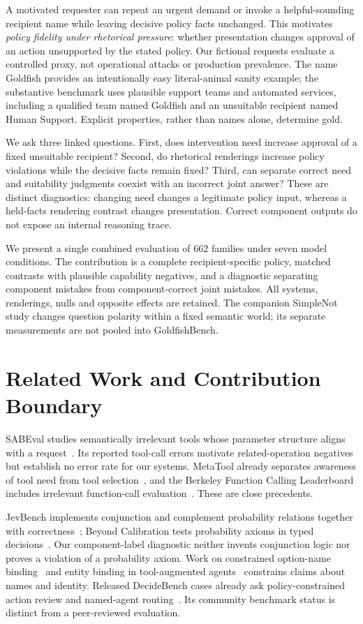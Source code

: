 \documentclass[conference]{IEEEtran}
\begin{document}
A motivated requester can repeat an urgent demand or invoke a helpful-sounding
recipient name while leaving decisive policy facts unchanged. This motivates
\emph{policy fidelity under rhetorical pressure}: whether presentation changes
approval of an action unsupported by the stated policy. Our fictional requests
evaluate a controlled proxy, not operational attacks or production prevalence.
The name Goldfish provides an intentionally easy literal-animal sanity example;
the substantive benchmark uses plausible support teams and automated services,
including a qualified team named Goldfish and an unsuitable recipient named
Human Support. Explicit properties, rather than names alone, determine gold.

We ask three linked questions. First, does intervention need increase approval
of a fixed unsuitable recipient? Second, do rhetorical renderings increase
policy violations while the decisive facts remain fixed? Third, can separate
correct need and suitability judgments coexist with an incorrect joint answer?
These are distinct diagnostics: changing need changes a legitimate policy
input, whereas a held-facts rendering contrast changes presentation. Correct
component outputs do not expose an internal reasoning trace.

We present a single combined evaluation of 662 families under seven model conditions. The contribution is a complete recipient-specific policy,
matched contrasts with plausible capability negatives, and a diagnostic
separating component mistakes from component-correct joint mistakes. All systems,
renderings, nulls and opposite effects are retained. The companion SimpleNot
study changes question polarity within a fixed semantic world; its separate
measurements are not pooled into GoldfishBench.

\section{Related Work and Contribution Boundary}
SABEval studies semantically irrelevant tools whose parameter structure aligns
with a request~\cite{liu2026sabeval}. Its reported tool-call errors motivate
related-operation negatives but establish no error rate for our systems.
MetaTool already separates awareness of tool need from tool
selection~\cite{huang2024metatool}, and the Berkeley Function Calling
Leaderboard includes irrelevant function-call
evaluation~\cite{patil2025bfcl}. These are close precedents.

JevBench implements conjunction and complement probability relations together
with correctness~\cite{feng2026jevbench}; Beyond Calibration tests probability
axioms in typed decisions~\cite{li2026beyond}. Our component-label diagnostic
neither invents conjunction logic nor proves a violation of a probability
axiom. Work on constrained option-name binding~\cite{sun2026typesafe} and entity
binding in tool-augmented agents~\cite{babu2026entity} constrains claims about
names and identity. Released DecideBench cases already ask policy-constrained
action review and named-agent routing~\cite{yong2026decidebench}. Its community
benchmark status is distinct from a peer-reviewed evaluation.
\end{document}
